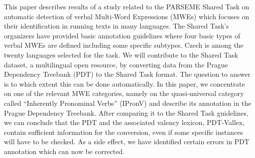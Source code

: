 This paper describes results of a study related to the PARSEME Shared Task on automatic detection of verbal Multi-Word Expressions (MWEs) which focuses on their identification in running texts in many languages. The Shared Task's organizers have provided basic annotation guidelines where four basic types of verbal MWEs are defined including some specific subtypes. Czech is among the twenty languages selected for the task. We will contribute to the Shared Task dataset,  a multilingual open resource, by converting data from the Prague Dependency Treebank (PDT) to the Shared Task format. The question to answer is to which extent this can be done automatically. In this paper, we concentrate on one of the relevant MWE categories, namely on the quasi-universal category called ``Inherently Pronominal Verbs'' (IPronV) and describe its annotation in the Prague Dependency Treebank. After comparing it to the Shared Task guidelines, we can conclude that the PDT and the associated valency lexicon, PDT-Vallex, contain sufficient information for the conversion, even if some specific instances will have to be checked.  As a side effect, we have identified certain errors in PDT annotation which can now be corrected.
